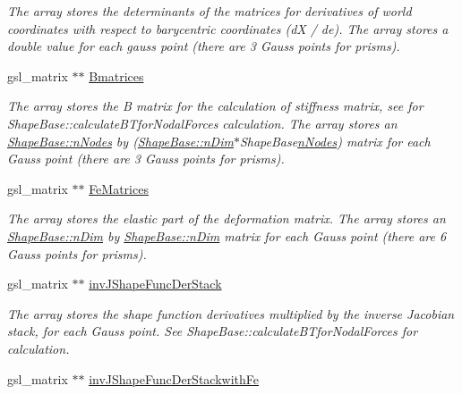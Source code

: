 \begin{DoxyCompactItemize}
\begin{DoxyCompactList}\small\item\em The array stores the determinants of the matrices for derivatives of world coordinates with respect to barycentric coordinates (d\+X / de). The array stores a double value for each gauss point (there are 3 Gauss points for prisms). \end{DoxyCompactList}\item 
\hypertarget{classShapeBase_ace860a66508f503be2a46c351a9358c3}{}gsl\+\_\+matrix $\ast$$\ast$ \hyperlink{classShapeBase_ace860a66508f503be2a46c351a9358c3}{Bmatrices}\label{classShapeBase_ace860a66508f503be2a46c351a9358c3}

\begin{DoxyCompactList}\small\item\em The array stores the B matrix for the calculation of stiffness matrix, see for Shape\+Base\+::calculate\+B\+Tfor\+Nodal\+Forces calculation. The array stores an \hyperlink{classShapeBase_ae7dd93b58b3281ce90025f83d0f0e976}{Shape\+Base\+::n\+Nodes} by (\hyperlink{classShapeBase_a250bd3396546342c8104f5b9c180d18f}{Shape\+Base\+::n\+Dim}$\ast$\+Shape\+Base\hyperlink{classShapeBase_ae7dd93b58b3281ce90025f83d0f0e976}{n\+Nodes}) matrix for each Gauss point (there are 3 Gauss points for prisms). \end{DoxyCompactList}\item 
\hypertarget{classShapeBase_ac3259f3f52ab4d7a514ea987012a6bd6}{}gsl\+\_\+matrix $\ast$$\ast$ \hyperlink{classShapeBase_ac3259f3f52ab4d7a514ea987012a6bd6}{Fe\+Matrices}\label{classShapeBase_ac3259f3f52ab4d7a514ea987012a6bd6}

\begin{DoxyCompactList}\small\item\em The array stores the elastic part of the deformation matrix. The array stores an \hyperlink{classShapeBase_a250bd3396546342c8104f5b9c180d18f}{Shape\+Base\+::n\+Dim} by \hyperlink{classShapeBase_a250bd3396546342c8104f5b9c180d18f}{Shape\+Base\+::n\+Dim} matrix for each Gauss point (there are 6 Gauss points for prisms). \end{DoxyCompactList}\item 
\hypertarget{classShapeBase_a9478b062928ae554c25cd3269cc9e790}{}gsl\+\_\+matrix $\ast$$\ast$ \hyperlink{classShapeBase_a9478b062928ae554c25cd3269cc9e790}{inv\+J\+Shape\+Func\+Der\+Stack}\label{classShapeBase_a9478b062928ae554c25cd3269cc9e790}

\begin{DoxyCompactList}\small\item\em The array stores the shape function derivatives multiplied by the inverse Jacobian stack, for each Gauss point. See Shape\+Base\+::calculate\+B\+Tfor\+Nodal\+Forces for calculation. \end{DoxyCompactList}\item 
\hypertarget{classShapeBase_a490391c781e50cfc7e2f1a0814bb6d25}{}gsl\+\_\+matrix $\ast$$\ast$ \hyperlink{classShapeBase_a490391c781e50cfc7e2f1a0814bb6d25}{inv\+J\+Shape\+Func\+Der\+Stackwith\+Fe}\label{classShapeBase_a490391c781e50cfc7e2f1a0814bb6d25}


\end{DoxyCompactItemize}
